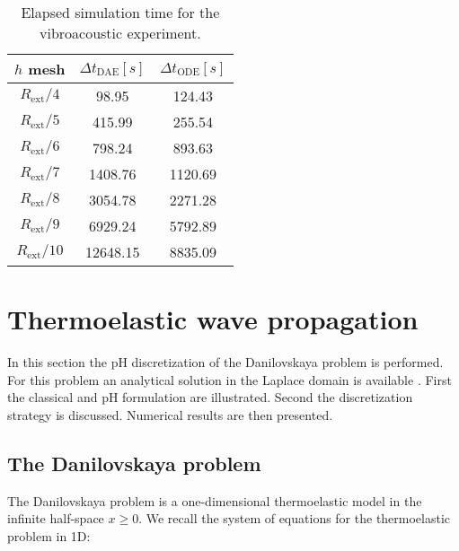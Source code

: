 \begin{table}[t]
	\centering
	\begin{tabular}{ccc}
		\hline 
		$h$ mesh & $\Delta t_{\text{DAE}} [s]$ & $\Delta t_{\text{ODE}} [s]$  \\ 
		\hline 
		$R_{\text{ext}}/4$ & 98.95 & 124.43 \\
		$R_{\text{ext}}/5$ & 415.99 & 255.54 \\
		$R_{\text{ext}}/6$ & 798.24 & 893.63 \\
		$R_{\text{ext}}/7$ & 1408.76 & 1120.69 \\
		$R_{\text{ext}}/8$ & 3054.78 & 2271.28 \\
		$R_{\text{ext}}/9$ & 6929.24 & 5792.89 \\
		$R_{\text{ext}}/10$ & 12648.15 & 8835.09 \\
		\hline 
	\end{tabular} 
	\vspace{1mm}
	\caption{Elapsed simulation time for the vibroacoustic experiment.}
	\label{tab:deltaT}
\end{table}


\section{Thermoelastic wave propagation}\label{sec:thelas_wave}

In this section the pH discretization of the Danilovskaya problem \cite{danilovskaya1950} is performed. For this problem an analytical solution in the Laplace domain is available \cite{balla1991}. First the classical and pH formulation are illustrated. Second the discretization strategy is discussed. Numerical results are then presented.

\subsection{The Danilovskaya problem}
The Danilovskaya problem is a one-dimensional thermoelastic model in the infinite half-space $x\ge 0$. We recall the system of equations for the thermoelastic problem in 1D:

